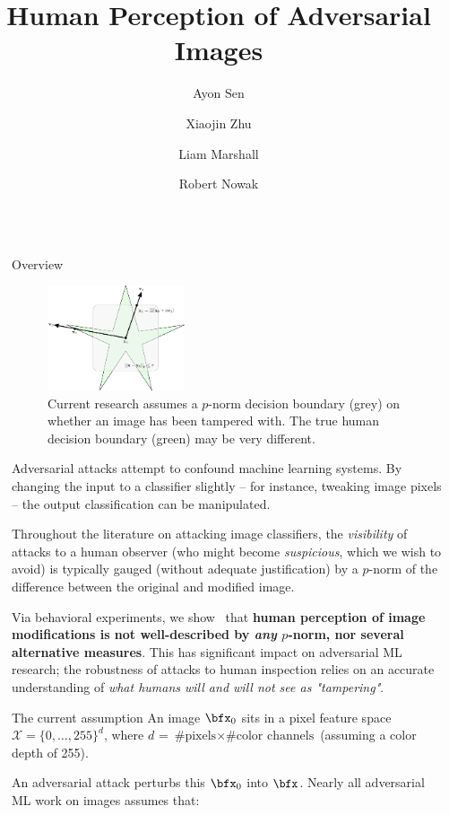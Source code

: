\documentclass[final,notheorems]{beamer}
\title{Human Perception of Adversarial Images}
\author{Ayon Sen \and Xiaojin Zhu \and Liam Marshall \and Robert Nowak}
\institute[shortinst]{University of Wisconsin-Madison}
\newlength{\sepwidth}
\newlength{\colwidth}
\newcommand{\separatorcolumn}{\begin{column}{\sepwidth}\end{column}}
\def\X{\mathcal X}
\begin{document}
\begin{frame}[t]
\begin{columns}[t]
\separatorcolumn

\begin{column}{\colwidth}
  \begin{block}{Overview}
    \begin{figure}
      \centering
      \includegraphics[width=0.38\textwidth]{fig/intro_image-figure0.eps}
      \caption{Current research assumes a $p$-norm decision boundary (grey) on whether an image has been tampered with. The true human decision boundary (green) may be very different.}
      \label{fig:decision_boundary}
    \end{figure}
    Adversarial attacks attempt to confound machine learning systems. By changing the input to a classifier slightly -- for instance, tweaking image pixels -- the output classification can be manipulated.

    Throughout the literature on attacking image classifiers, the \emph{visibility} of attacks to a human observer (who might become \emph{suspicious}, which we wish to avoid) is typically gauged (without adequate justification) by a $p$-norm of the difference between the original and modified image.

    Via behavioral experiments, we show~\cite{sen2019perception} that \textbf{human perception of image modifications is not well-described by \emph{any} $p$-norm, nor several alternative measures}.
    This has significant impact on adversarial ML research; the robustness of attacks to human inspection relies on an accurate understanding of \emph{what humans will and will not see as "tampering"}.

  \end{block}

  \begin{alertblock}{The current assumption}
    An image $\bfx_0$ sits in a pixel feature space $\X = \{0,\ldots,255\}^d$, where $d$ = $\text{\# pixels} \times \text{\# color channels}$ (assuming a color depth of 255).

    An adversarial attack perturbs this $\bfx_0$ into $\bfx$. Nearly all adversarial ML work on images assumes that:


\end{alertblock}
\end{column}
\end{columns}
\end{frame}
\end{document}
